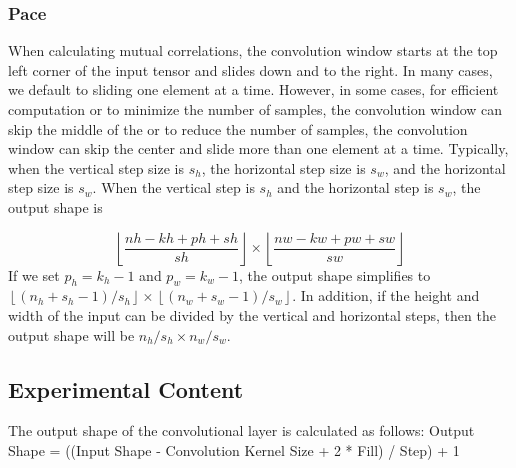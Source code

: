 \documentclass[a4paper,12pt]{article}
\begin{document}
\subsubsection{Pace}
When calculating mutual correlations, the convolution window starts at the top left corner of the input tensor and slides down and to the right. In many
cases, we default to sliding one element at a time. However, in some cases, for efficient computation or to minimize the number of samples, the convolution window can skip the middle of the
or to reduce the number of samples, the convolution window can skip the center and slide more than one element at a time. Typically, when the vertical step size is $s_h$, the horizontal step size is $s_w$, and the horizontal step size is $s_w$.
When the vertical step is $s_h$ and the horizontal step is $s_w$, the output shape is

\begin{equation}
\left\lfloor \frac{nh - kh + ph + sh}{sh} \right\rfloor \times \left\lfloor \frac{nw - kw + pw + sw}{sw} \right\rfloor
\end{equation}
If we set \( p_h = k_h - 1 \) and \( p_w = k_w - 1 \), the output shape simplifies to \( \left\lfloor (n_h + s_h - 1)/s_h \right\rfloor \times \left\lfloor (n_w + s_w - 1)/s_w \right\rfloor \). In addition, if the height and width of the input can be divided by the vertical and horizontal steps, then the output shape will be \( n_h/s_h \times n_w/s_w \).

\subsection{Experimental Content}
The output shape of the convolutional layer is calculated as follows:
Output Shape = ((Input Shape - Convolution Kernel Size + 2 * Fill) / Step) + 1
\end{document}
